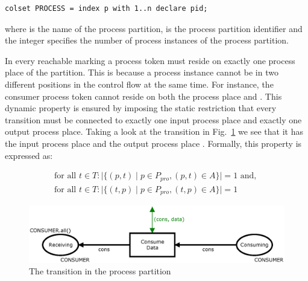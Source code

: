 \begin{verbatim}
colset PROCESS = index p with 1..n declare pid;
\end{verbatim}

\noindent
where  is the name of the process partition,  is the process partition identifier and the integer  specifies the number of process instances of the process partition.

In every reachable marking a process token must reside on exactly one process place of the partition. This is because a process instance cannot be in two different positions in the control flow at the same time. For instance, the consumer process token  cannot reside on both the process place  and . This dynamic property is ensured by imposing the static restriction that every transition must be connected to exactly one input process place and exactly one output process place. Taking a look at the transition  in Fig.~\ref{fig:consumedatatrans} we see that it has the input process place  and the output process place . Formally, this property is expressed as:

\begin{displaymath}
\begin{array}{l}
\text{for all } t \in T: \mid \{ (p, t) \mid p \in P_{pro}, (p, t) \in A \}\mid = 1 \text{ and, } \\
\text{for all } t \in T: \mid \{ (t, p) \mid p \in P_{pro}, (t, p) \in A \}\mid = 1 
\end{array}
\end{displaymath}

\begin{figure}
\centering
\includegraphics[scale=0.5]{netclass/graphics/consumedatatrans.eps}
\caption{The transition  in the  process partition}
\label{fig:consumedatatrans}
\end{figure}

